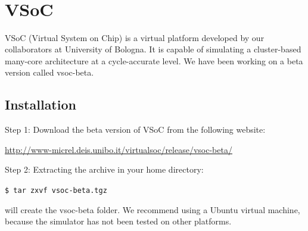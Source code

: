 \documentclass{article}
\title{
\vspace{2in}
\textmd{\textbf{\hmwkClass}}\\
\textmd{\textbf{\hmwkTitle}}\\
\normalsize\vspace{0.1in}\small{\hmwkDueDate}\\
\vspace{0.1in}\large{\textit{\hmwkClassInstructor}}
\vspace{3in}
}
\author{\textbf{\hmwkAuthorName}}
\date{}
\begin{document}
\maketitle


\setcounter{tocdepth}{3} %

\newpage
\tableofcontents
\newpage




\section{VSoC}

VSoC (Virtual System on Chip) is a virtual platform developed by our collaborators at University of Bologna. It is capable of simulating a cluster-based many-core architecture at a cycle-accurate level. We have been working on a beta version called vsoc-beta.

\vspace{-2mm}
\subsection{Installation} 

Step 1: Download the beta version of VSoC from the following website:

\hspace{17.5mm}\href{http://www-micrel.deis.unibo.it/virtualsoc/release/vsoc-beta/}{http://www-micrel.deis.unibo.it/virtualsoc/release/vsoc-beta/}



\vspace{3mm}
\hangindent=12.5mm
Step 2: Extracting the archive in your home directory:

{
\addtolength{\leftskip}{12.5mm}

\hspace{5mm}\texttt{\$ tar zxvf vsoc-beta.tgz}

will create the vsoc-beta folder. We recommend using a Ubuntu virtual machine, because the simulator has not been tested on other platforms.

}
\end{document}
